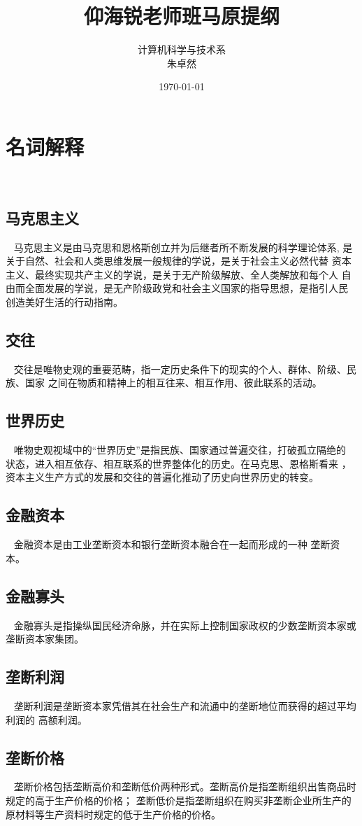 \documentclass{ctexart}
\title{\textbf{仰海锐老师班马原提纲}}
\author{计算机科学与技术系 \\{\small 朱卓然}}
\date{\today}
\begin{document}
\maketitle

\section{名词解释}~{}
\subsection{马克思主义}~{}
马克思主义是由马克思和恩格斯创立并为后继者所不断发展的科学理论体系,
是关于自然、社会和人类思维发展一般规律的学说，是关于社会主义必然代替
资本主义、最终实现共产主义的学说，是关于无产阶级解放、全人类解放和每个人
自由而全面发展的学说，是无产阶级政党和社会主义国家的指导思想，是指引人民
创造美好生活的行动指南。

\subsection{交往}~{}
交往是唯物史观的重要范畴，指一定历史条件下的现实的个人、群体、阶级、民族、国家
之间在物质和精神上的相互往来、相互作用、彼此联系的活动。

\subsection{世界历史}~{}
唯物史观视域中的“世界历史”是指民族、国家通过普遍交往，打破孤立隔绝的
状态，进入相互依存、相互联系的世界整体化的历史。在马克思、恩格斯看来
，资本主义生产方式的发展和交往的普遍化推动了历史向世界历史的转变。

\subsection{金融资本}~{}
金融资本是由工业垄断资本和银行垄断资本融合在一起而形成的一种
垄断资本。
\subsection{金融寡头}~{}
金融寡头是指操纵国民经济命脉，并在实际上控制国家政权的少数垄断资本家或
垄断资本家集团。

\subsection{垄断利润}~{}
垄断利润是垄断资本家凭借其在社会生产和流通中的垄断地位而获得的超过平均利润的
高额利润。
\subsection{垄断价格}~{}
垄断价格包括垄断高价和垄断低价两种形式。垄断高价是指垄断组织出售商品时规定的高于生产价格的价格；
垄断低价是指垄断组织在购买非垄断企业所生产的原材料等生产资料时规定的低于生产价格的价格。
\vspace{+10mm}
\end{document}
